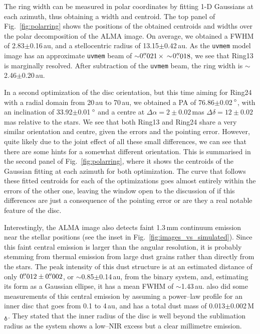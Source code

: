 \documentclass[fleqn,usenatbib,useAMS]{mnras}
\begin{document}
The ring width can be measured in polar coordinates by fitting 1-D Gaussians at each azimuth, thus obtaining a width and centroid. The top panel of Fig.~\ref{fig:polarring} shows the positions of the obtained centroids and widths over the polar decomposition of the ALMA image. On average, we obtained a FWHM of 2.83$\pm$0.16\,au, and a stellocentric radius of 13.15$\pm$0.42\,au. As the {\tt uvmem} model image has an approximate {\tt uvmem} beam of $\sim$0$\hbox{$.\!\!^{\prime\prime}$}021 \,\times \,\sim$0$\hbox{$.\!\!^{\prime\prime}$}018$, we see that Ring13 is marginally resolved. After subtraction of the {\tt uvmem} beam, the ring width is $\sim$2.46$\pm$0.20\,au.

In a second optimization of the disc orientation, but this time aiming for Ring24 with a radial domain from 20\,au to 70\,au, we obtained a PA of 76.86$\pm$0.02\,$\hbox{$^\circ$}$, with an inclination of 33.92$\pm$0.01\,$\hbox{$^\circ$}$ and a centre at $\Delta \alpha = 2\pm0.02$\,mas $\Delta \delta = 12\pm0.02$\,mas relative to the stars. We see that both Ring13 and Ring24 share a very similar orientation and centre, given the errors and the pointing error. However, quite likely due to the joint effect of all these small differences, we can see that there are some hints for a somewhat different orientation. This is summarised in the second panel of Fig.~\ref{fig:polarring}, where it shows the centroids of the Gaussian fitting at each azimuth for both optimization. The curve that follows these fitted centroids for each of the optimizations goes almost entirely within the errors of the other one, leaving the window open to the discussion of if this differences are just a consequence of the pointing error or are they a real notable feature of the disc.

Interestingly, the ALMA image also detects faint 1.3\,mm continuum emission near the stellar positions (see the inset in Fig.~\ref{fig:images_vs_simulated}). Since this faint central emission is larger than the angular resolution, it is probably stemming from thermal emission from large dust grains rather than directly from the stars. The peak intensity of this dust structure is at an estimated distance of only $0\hbox{$.\!\!^{\prime\prime}$}012\pm0\hbox{$.\!\!^{\prime\prime}$}002$, or $\sim$0.85$\pm$0.14\,au, from the binary system, and, estimating its form as a Gaussian ellipse, it has a mean FWHM of $\sim$1.43\,au. \citet{Francis_2020} also did some measurements of this central emission by assuming a power--law profile for an inner disc that goes from 0.1 to 4\,au, and has a total dust mass of 0.013$\pm$0.002\,M$_{\earth}$. They stated that the inner radius of the disc is well beyond the sublimation radius as the system shows a low--NIR excess but a clear millimetre emission.
\end{document}
